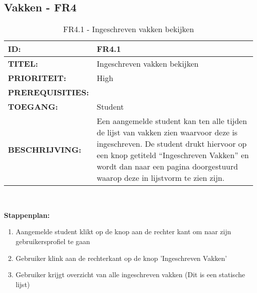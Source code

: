 \subsection{Vakken - FR4}

\noindent\begin{table}[H]
            \begin{tabular}{l | p{10cm}}
                \textbf{ID:} & FR4.1 \\ \hline
                \textbf{TITEL:} & Ingeschreven vakken bekijken\\ \hline
                \textbf{PRIORITEIT:} &  High \\ \hline
                \textbf{PREREQUISITIES:} & \\ \hline
                \textbf{TOEGANG:} &  Student \\ \hline
                \textbf{BESCHRIJVING:} & Een aangemelde student kan ten alle tijden de lijst van vakken zien waarvoor deze is ingeschreven. De student drukt hiervoor op een knop getiteld “Ingeschreven Vakken” en wordt dan naar een pagina doorgestuurd waarop deze in lijstvorm te zien zijn.\\
            \end{tabular}\\
            \caption{FR4.1 - Ingeschreven vakken bekijken}
            \label{tab:FR4.1 - Ingeschreven vakken bekijken}
        \end{table}  
        
\textbf{Stappenplan:}
	\begin{enumerate}
	\item Aangemelde student klikt op de knop aan de rechter kant om naar zijn gebruikersprofiel te gaan
	\item Gebruiker klink aan de rechterkant op de knop 'Ingeschreven Vakken'
	\item Gebruiker krijgt overzicht van alle ingeschreven vakken (Dit is een statische lijst)
	\end{enumerate}

